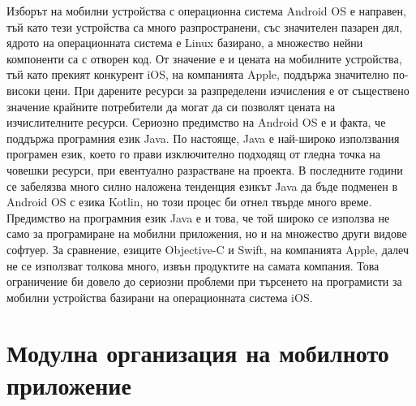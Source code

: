 Изборът на мобилни устройства с операционна система Android OS е направен, тъй като тези устройства са много разпространени, със значителен пазарен дял, ядрото на операционната система е Linux базирано, а множество нейни компоненти са с отворен код. От значение е и цената на мобилните устройства, тъй като прекият конкурент iOS, на компанията Apple, поддържа значително по-високи цени. При дарените ресурси за разпределени изчисления е от съществено значение крайните потребители да могат да си позволят цената на изчислителните ресурси. Сериозно предимство на Android OS е и факта, че поддържа програмния език Java. По настояще, Java е най-широко използвания програмен език, което го прави изключително подходящ от гледна точка на човешки ресурси, при евентуално разрастване на проекта. В последните години се забелязва много силно наложена тенденция езикът Java да бъде подменен в Android OS с езика Kotlin, но този процес би отнел твърде много време. Предимство на програмния език Java е и това, че той широко се използва не само за програмиране на мобилни приложения, но и на множество други видове софтуер. За сравнение, езиците Objective-C и Swift, на компанията Apple, далеч не се използват толкова много, извън продуктите на самата компания. Това ограничение би довело до сериозни проблеми при търсенето на програмисти за мобилни устройства базирани на операционната система iOS. 

\section{Модулна организация на мобилното приложение}


